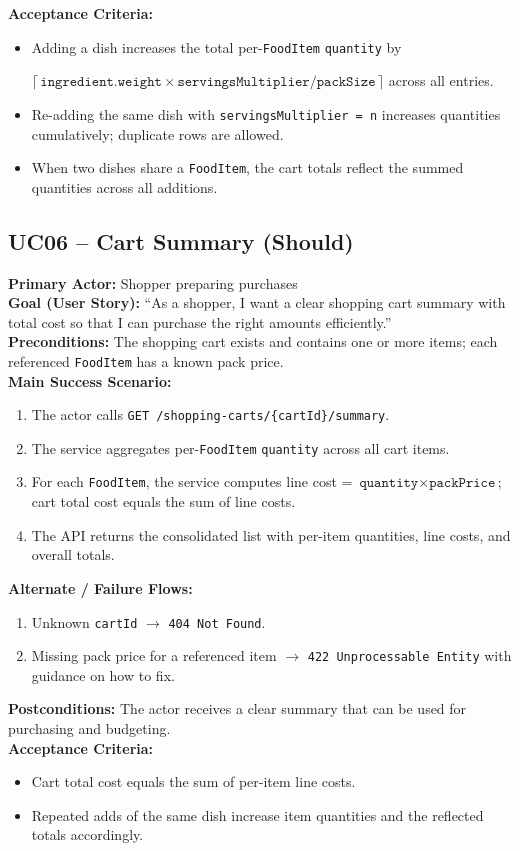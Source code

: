 \documentclass[11pt]{article}
\begin{document}
\textbf{Acceptance Criteria:}
\begin{itemize}[noitemsep]
  \item Adding a dish increases the total per-\texttt{FoodItem} \texttt{quantity} by
  
  \(\lceil\,\texttt{ingredient.weight} \times \texttt{servingsMultiplier} / \texttt{packSize}\,\rceil\) across all entries.
  \item Re-adding the same dish with \texttt{servingsMultiplier = n} increases quantities cumulatively; duplicate rows are allowed.
  \item When two dishes share a \texttt{FoodItem}, the cart totals reflect the summed quantities across all additions.
\end{itemize}

\subsection*{UC06 -- Cart Summary (Should)}
\textbf{Primary Actor:} Shopper preparing purchases\\
\textbf{Goal (User Story):} ``As a shopper, I want a clear shopping cart summary with total cost so that I can purchase the right amounts efficiently.''\\
\textbf{Preconditions:} The shopping cart exists and contains one or more items; each referenced \texttt{FoodItem} has a known pack price.\\
\textbf{Main Success Scenario:}
\begin{enumerate}[label=\arabic*.]
  \item The actor calls \texttt{GET /shopping-carts/\{cartId\}/summary}.
  \item The service aggregates per-\texttt{FoodItem} \texttt{quantity} across all cart items.
  \item For each \texttt{FoodItem}, the service computes line cost = \(\texttt{quantity} \times \texttt{packPrice}\); cart total cost equals the sum of line costs.
  \item The API returns the consolidated list with per-item quantities, line costs, and overall totals.
\end{enumerate}
\textbf{Alternate / Failure Flows:}
\begin{enumerate}[label=\arabic*F.]
  \item Unknown \texttt{cartId} $\rightarrow$ \texttt{404 Not Found}.
  \item Missing pack price for a referenced item $\rightarrow$ \texttt{422 Unprocessable Entity} with guidance on how to fix.
\end{enumerate}
\textbf{Postconditions:} The actor receives a clear summary that can be used for purchasing and budgeting.\\
\textbf{Acceptance Criteria:}
\begin{itemize}[noitemsep]
  \item Cart total cost equals the sum of per-item line costs.
  \item Repeated adds of the same dish increase item quantities and the reflected totals accordingly.
\end{itemize}
\end{document}
